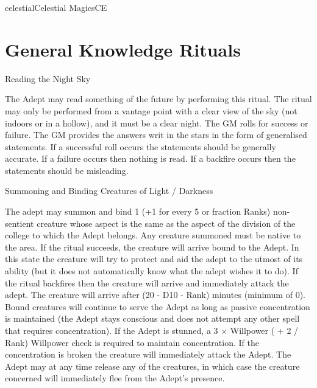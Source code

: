 \begin{College}[1.3]{celestial}{Celestial Magics}{CE}
\section{General Knowledge Rituals}

\begin{ritual}[Q-1]{Reading the Night Sky}

\begin{effects}
The Adept may read something of the future by performing this ritual.
The ritual may only be performed from a vantage point with a clear
view of the sky (not indoors or in a hollow), and it must be a clear
night.  The GM rolls for success or failure.  The GM provides the
answers writ in the stars in the form of generalised statements.  If a
successful roll occurs the statements should be generally accurate.
If a failure occurs then nothing is read.  If a backfire occurs then
the statements should be misleading.
\end{effects}
\end{ritual}


\begin{ritual}[Q-2]{Summoning and Binding Creatures of Light / Darkness}

\begin{effects}
The adept may summon and bind 1 (+1 for every 5 or fraction Ranks)
non-sentient creature whose aspect is the same as the aspect of the
division of the college to which the Adept belongs.  Any creature
summoned must be native to the area.  If the ritual succeeds, the
creature will arrive bound to the Adept.  In this state the creature
will try to protect and aid the adept to the utmost of its ability
(but it does not automatically know what the adept wishes it to do).
If the ritual backfires then the creature will arrive and immediately
attack the adept.  The creature will arrive after (20 - D10 - Rank)
minutes (minimum of 0).  Bound creatures will continue to serve the
Adept as long as passive concentration is maintained (the Adept stays
conscious and does not attempt any other spell that requires
concentration).  If the Adept is stunned, a 3 × Willpower ( + 2 /
Rank) Willpower check is required to maintain concentration.  If the
concentration is broken the creature will immediately attack the
Adept.  The Adept may at any time release any of the creatures, in
which case the creature concerned will immediately flee from the
Adept’s presence.


\end{effects}
\end{ritual}
\end{College}
